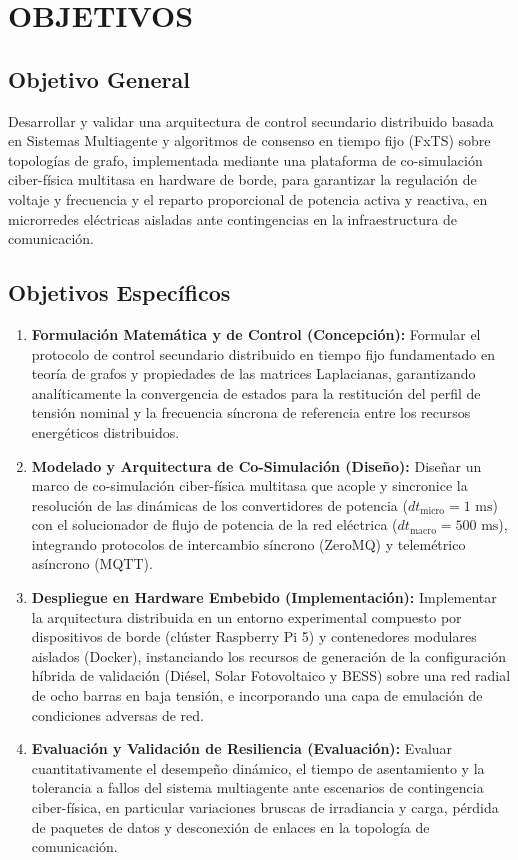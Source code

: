 \section{OBJETIVOS}
\label{sec:objetivos}

\subsection{Objetivo General}
Desarrollar y validar una arquitectura de control secundario distribuido basada en Sistemas Multiagente y algoritmos de consenso en tiempo fijo (FxTS) sobre topologías de grafo, implementada mediante una plataforma de co-simulación ciber-física multitasa en hardware de borde, para garantizar la regulación de voltaje y frecuencia y el reparto proporcional de potencia activa y reactiva, en microrredes eléctricas aisladas ante contingencias en la infraestructura de comunicación.

\subsection{Objetivos Específicos}
\begin{enumerate}
    \item \textbf{Formulación Matemática y de Control (Concepción):} Formular el protocolo de control secundario distribuido en tiempo fijo fundamentado en teoría de grafos y propiedades de las matrices Laplacianas, garantizando analíticamente la convergencia de estados para la restitución del perfil de tensión nominal y la frecuencia síncrona de referencia entre los recursos energéticos distribuidos.
    
    \item \textbf{Modelado y Arquitectura de Co-Simulación (Diseño):} Diseñar un marco de co-simulación ciber-física multitasa que acople y sincronice la resolución de las dinámicas de los convertidores de potencia ($dt_{\text{micro}} = 1\text{ ms}$) con el solucionador de flujo de potencia de la red eléctrica ($dt_{\text{macro}} = 500\text{ ms}$), integrando protocolos de intercambio síncrono (ZeroMQ) y telemétrico asíncrono (MQTT).
    
    \item \textbf{Despliegue en Hardware Embebido (Implementación):} Implementar la arquitectura distribuida en un entorno experimental compuesto por dispositivos de borde (clúster Raspberry Pi 5) y contenedores modulares aislados (Docker), instanciando los recursos de generación de la configuración híbrida de validación (Diésel, Solar Fotovoltaico y BESS) sobre una red radial de ocho barras en baja tensión, e incorporando una capa de emulación de condiciones adversas de red.
    
    \item \textbf{Evaluación y Validación de Resiliencia (Evaluación):} Evaluar cuantitativamente el desempeño dinámico, el tiempo de asentamiento y la tolerancia a fallos del sistema multiagente ante escenarios de contingencia ciber-física, en particular variaciones bruscas de irradiancia y carga, pérdida de paquetes de datos y desconexión de enlaces en la topología de comunicación.
\end{enumerate}
